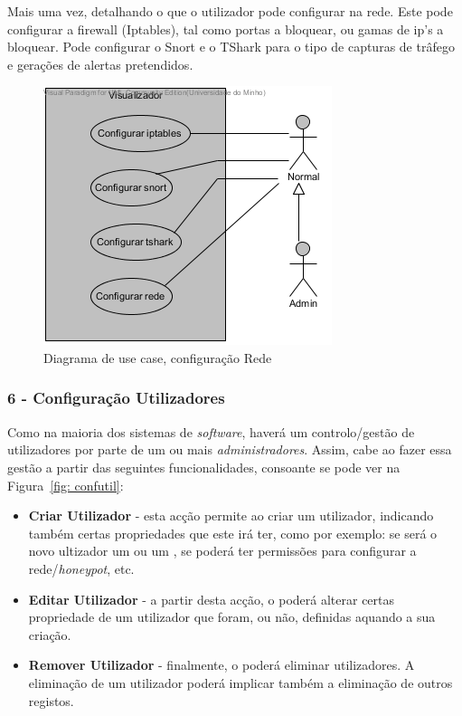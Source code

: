 Mais uma vez, detalhando o que o utilizador pode configurar na rede. Este pode configurar a firewall (Iptables), tal como portas a bloquear, ou gamas
de ip's a bloquear. Pode configurar o Snort e o TShark para o tipo de capturas de trâfego e gerações de alertas pretendidos.

\begin{figure}[!htb]
	\centering
	\includegraphics[scale=0.80]{images/ucs/ConfRede}
	\caption {Diagrama de use case, configuração Rede}
\end{figure}
\pagebreak

\subsubsection{\textbf{6 - Configuração Utilizadores}}

Como na maioria dos sistemas de \emph{software}, haverá um controlo/gestão de utilizadores por parte de um ou mais \emph{administradores}. Assim, cabe ao \admini fazer essa gestão a partir das seguintes funcionalidades, consoante se pode ver na Figura~\ref{fig: confutil}:

\begin{itemize}
 \item \textbf{Criar Utilizador} - esta acção permite ao \admini criar um utilizador, indicando também certas propriedades que este irá ter, como por exemplo: se será o novo ultizador um \admini ou um \uticomum, se poderá ter permissões para configurar a rede/\emph{honeypot}, etc.
 \item \textbf{Editar Utilizador} - a partir desta acção, o \admini poderá alterar certas propriedade de um utilizador que foram, ou não, definidas aquando a sua criação.
 \item \textbf{Remover Utilizador} - finalmente, o \admini poderá eliminar utilizadores. A eliminação de um utilizador poderá implicar também a eliminação de outros registos.
\end{itemize}

